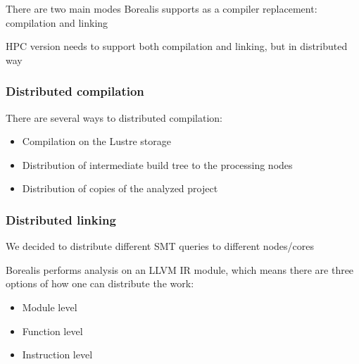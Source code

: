 

\begin{frame}
\begin{block}
	\centering
	There are two main modes Borealis supports as a compiler replacement: compilation and linking
\end{block}

\begin{block}
	\centering
	HPC version needs to support both compilation and linking, but in distributed way
\end{block}
\end{frame}



\begin{frame}
\frametitle{Distributed compilation}
There are several ways to distributed compilation:
\begin{itemize}
	\item Compilation on the Lustre storage
	\item Distribution of intermediate build tree to the processing nodes
	\item Distribution of copies of the analyzed project
\end{itemize} 
\end{frame}


\begin{frame}
\frametitle{Distributed linking}
\begin{block}
	\centering
	We decided to distribute different SMT queries to different nodes/cores
\end{block}	
	Borealis performs analysis on an LLVM IR module, which means there are three options of how one can distribute the work:
\begin{itemize}
	\item Module level
	\item Function level
	\item Instruction level
\end{itemize}
\end{frame}

